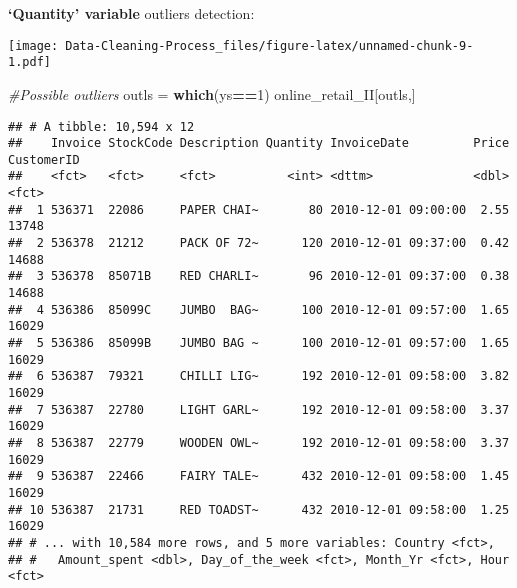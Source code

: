 \documentclass[
]{article}
\newenvironment{Shaded}{\begin{snugshade}}{\end{snugshade}}
\newcommand{\CommentTok}[1]{\textcolor[rgb]{0.56,0.35,0.01}{\textit{#1}}}
\newcommand{\DataTypeTok}[1]{\textcolor[rgb]{0.13,0.29,0.53}{#1}}
\newcommand{\DecValTok}[1]{\textcolor[rgb]{0.00,0.00,0.81}{#1}}
\newcommand{\KeywordTok}[1]{\textcolor[rgb]{0.13,0.29,0.53}{\textbf{#1}}}
\newcommand{\NormalTok}[1]{#1}
\newcommand{\OperatorTok}[1]{\textcolor[rgb]{0.81,0.36,0.00}{\textbf{#1}}}
\newcommand{\StringTok}[1]{\textcolor[rgb]{0.31,0.60,0.02}{#1}}
\begin{document}
\textbf{`Quantity' variable} outliers detection:

\begin{Shaded}
\end{Shaded}

\texttt{[image: Data-Cleaning-Process\_files/figure-latex/unnamed-chunk-9-1.pdf]}

\begin{Shaded}
\begin{Highlighting}[]
\CommentTok{#Possible outliers}
\NormalTok{outls =}\StringTok{ }\KeywordTok{which}\NormalTok{(ys}\OperatorTok{==}\DecValTok{1}\NormalTok{)}
\NormalTok{online_retail_II[outls,]}
\end{Highlighting}
\end{Shaded}

\begin{verbatim}
## # A tibble: 10,594 x 12
##    Invoice StockCode Description Quantity InvoiceDate         Price CustomerID
##    <fct>   <fct>     <fct>          <int> <dttm>              <dbl> <fct>     
##  1 536371  22086     PAPER CHAI~       80 2010-12-01 09:00:00  2.55 13748     
##  2 536378  21212     PACK OF 72~      120 2010-12-01 09:37:00  0.42 14688     
##  3 536378  85071B    RED CHARLI~       96 2010-12-01 09:37:00  0.38 14688     
##  4 536386  85099C    JUMBO  BAG~      100 2010-12-01 09:57:00  1.65 16029     
##  5 536386  85099B    JUMBO BAG ~      100 2010-12-01 09:57:00  1.65 16029     
##  6 536387  79321     CHILLI LIG~      192 2010-12-01 09:58:00  3.82 16029     
##  7 536387  22780     LIGHT GARL~      192 2010-12-01 09:58:00  3.37 16029     
##  8 536387  22779     WOODEN OWL~      192 2010-12-01 09:58:00  3.37 16029     
##  9 536387  22466     FAIRY TALE~      432 2010-12-01 09:58:00  1.45 16029     
## 10 536387  21731     RED TOADST~      432 2010-12-01 09:58:00  1.25 16029     
## # ... with 10,584 more rows, and 5 more variables: Country <fct>,
## #   Amount_spent <dbl>, Day_of_the_week <fct>, Month_Yr <fct>, Hour <fct>
\end{verbatim}
\end{document}

